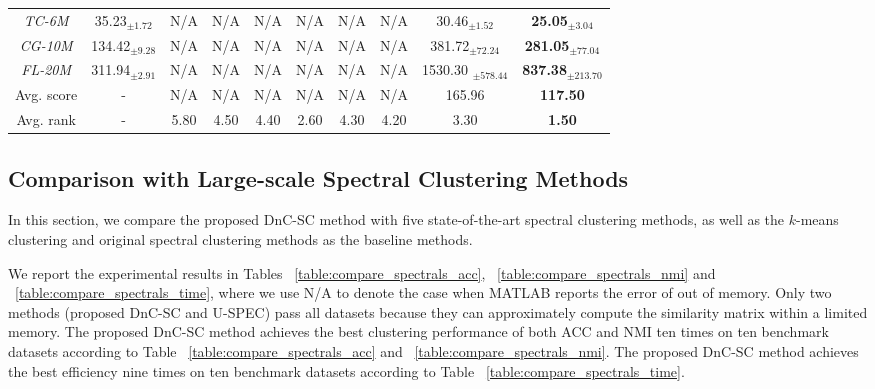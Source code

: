 \begin{table*}[]
{\begin{tabular}{@{}c||c||ccccccc|c@{}}
      \emph{TC-6M    }  & 35.23$_{\pm 1.72}$    & N/A                & N/A                    & N/A                     & N/A                        & N/A                 & N/A                 & 30.46$_{\pm 1.52}$      & \textbf{25.05$_{\pm 3.04}$}    \\
      \emph{CG-10M    } & 134.42$_{\pm 9.28}$   & N/A                & N/A                    & N/A                     & N/A                        & N/A                 & N/A                 & 381.72$_{\pm 72.24}$    & \textbf{281.05$_{\pm 77.04}$}  \\
      \emph{FL-20M}     & 311.94$_{\pm 2.91}$   & N/A                & N/A                    & N/A                     & N/A                        & N/A                 & N/A                 & 1530.30 $_{\pm 578.44}$ & \textbf{837.38$_{\pm 213.70}$} \\
      \midrule
      \midrule
      Avg. score        & \multicolumn{1}{c}{-} & N/A                & N/A                    & N/A                     & N/A                        & N/A                 & N/A                 & 165.96                  & \textbf{117.50}                \\
      \midrule
      \midrule
      Avg. rank         & \multicolumn{1}{c}{-} & 5.80               & 4.50                   & 4.40                    & 2.60                       & 4.30                & 4.20                & 3.30                    & \textbf{1.50 }                 \\
      \bottomrule
    \end{tabular}}
\end{table*}

\subsection{Comparison with Large-scale Spectral Clustering Methods}
\label{sec:cmp_spectral}


In this section, we compare the proposed DnC-SC method with five state-of-the-art spectral clustering methods, as well as the $k$-means clustering and original spectral clustering methods as the baseline methods.

We report the experimental results in Tables ~\ref{table:compare_spectrals_acc}, ~\ref{table:compare_spectrals_nmi} and ~\ref{table:compare_spectrals_time}, where we use N/A to denote the case when MATLAB reports the error of out of memory.
Only two methods (proposed DnC-SC and U-SPEC) pass all datasets because they can approximately compute the similarity matrix within a limited memory.
The proposed DnC-SC method achieves the best clustering performance of both ACC and NMI ten times on ten benchmark datasets according to Table ~\ref{table:compare_spectrals_acc} and ~\ref{table:compare_spectrals_nmi}.
The proposed DnC-SC method achieves the best efficiency nine times on ten benchmark datasets according to Table ~\ref{table:compare_spectrals_time}.

